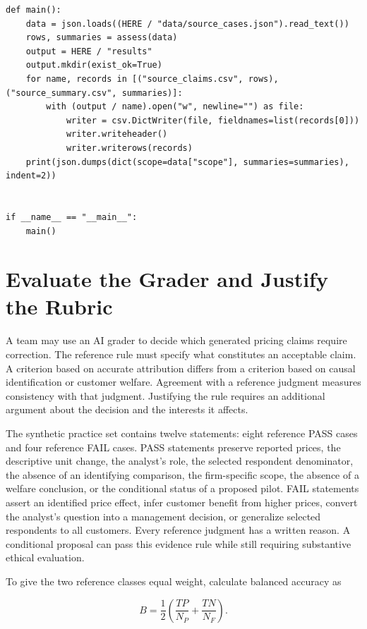 \begin{Verbatim}[breaklines,breakanywhere,fontsize=\small]
def main():
    data = json.loads((HERE / "data/source_cases.json").read_text())
    rows, summaries = assess(data)
    output = HERE / "results"
    output.mkdir(exist_ok=True)
    for name, records in [("source_claims.csv", rows), ("source_summary.csv", summaries)]:
        with (output / name).open("w", newline="") as file:
            writer = csv.DictWriter(file, fieldnames=list(records[0]))
            writer.writeheader()
            writer.writerows(records)
    print(json.dumps(dict(scope=data["scope"], summaries=summaries), indent=2))


if __name__ == "__main__":
    main()
\end{Verbatim}

\hypertarget{M05-evaluate-the-grader-and-justify-the-rubric}{%
\section{Evaluate the Grader and Justify the
Rubric}\label{M05-evaluate-the-grader-and-justify-the-rubric}}

\noindent \noindent A team may use an AI grader to decide which generated pricing
claims require correction. The reference rule must specify what
constitutes an acceptable claim. A criterion based on accurate
attribution differs from a criterion based on causal identification or
customer welfare. Agreement with a reference judgment measures
consistency with that judgment. Justifying the rule requires an
additional argument about the decision and the interests it affects.

The synthetic practice set contains twelve statements: eight reference
PASS cases and four reference FAIL cases. PASS statements preserve
reported prices, the descriptive unit change, the analyst's role, the
selected respondent denominator, the absence of an identifying
comparison, the firm-specific scope, the absence of a welfare
conclusion, or the conditional status of a proposed pilot. FAIL
statements assert an identified price effect, infer customer benefit
from higher prices, convert the analyst's question into a management
decision, or generalize selected respondents to all customers. Every
reference judgment has a written reason. A conditional proposal can pass
this evidence rule while still requiring substantive ethical evaluation.

To give the two reference classes equal weight, calculate balanced
accuracy as

\[
B=\frac{1}{2}\left(\frac{TP}{N_P}+\frac{TN}{N_F}\right).
\]

